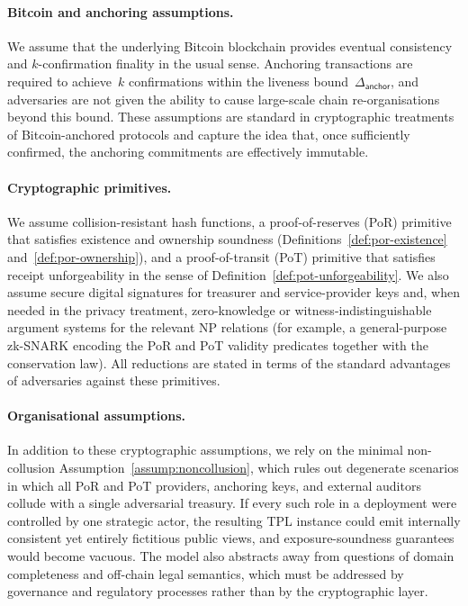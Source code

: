 \documentclass[11pt]{article}
\begin{document}
\paragraph{Bitcoin and anchoring assumptions.}
We assume that the underlying Bitcoin blockchain provides eventual consistency and $k$-confirmation finality in the usual sense.
Anchoring transactions are required to achieve~$k$ confirmations within the liveness bound~$\Delta_{\mathsf{anchor}}$, and adversaries are not given the ability to cause large-scale chain re-organisations beyond this bound.
These assumptions are standard in cryptographic treatments of Bitcoin-anchored protocols and capture the idea that, once sufficiently confirmed, the anchoring commitments are effectively immutable.

\paragraph{Cryptographic primitives.}
We assume collision-resistant hash functions, a proof-of-reserves (PoR) primitive that satisfies existence and ownership soundness (Definitions~\ref{def:por-existence} and~\ref{def:por-ownership}), and a proof-of-transit (PoT) primitive that satisfies receipt unforgeability in the sense of Definition~\ref{def:pot-unforgeability}.
We also assume secure digital signatures for treasurer and service-provider keys and, when needed in the privacy treatment, zero-knowledge or witness-indistinguishable argument systems for the relevant NP relations (for example, a general-purpose zk-SNARK encoding the PoR and PoT validity predicates together with the conservation law).
All reductions are stated in terms of the standard advantages of adversaries against these primitives.

\paragraph{Organisational assumptions.}
In addition to these cryptographic assumptions, we rely on the minimal non-collusion Assumption~\ref{assump:noncollusion}, which rules out degenerate scenarios in which all PoR and PoT providers, anchoring keys, and external auditors collude with a single adversarial treasury.
If every such role in a deployment were controlled by one strategic actor, the resulting TPL instance could emit internally consistent yet entirely fictitious public views, and exposure-soundness guarantees would become vacuous.
The model also abstracts away from questions of domain completeness and off-chain legal semantics, which must be
addressed by governance and regulatory processes rather than by the cryptographic layer.
\end{document}
